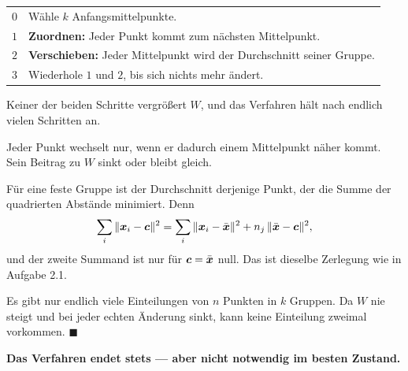 \begin{merksatz}
\begin{center}
{\small
\renewcommand{\arraystretch}{1.5}
\begin{tabular}{@{}P{1.0cm}P{7.4cm}@{}}
\toprule
$0$ & Wähle $k$ Anfangsmittelpunkte.\\
$1$ & \textbf{Zuordnen:} Jeder Punkt kommt zum nächsten Mittelpunkt.\\
$2$ & \textbf{Verschieben:} Jeder Mittelpunkt wird der Durchschnitt seiner Gruppe.\\
$3$ & Wiederhole $1$ und $2$, bis sich nichts mehr ändert.\\
\bottomrule
\end{tabular}}
\end{center}

Keiner der beiden Schritte vergrößert $W$, und das Verfahren hält nach endlich vielen Schritten an.

 Jeder Punkt wechselt nur, wenn er dadurch einem Mittelpunkt näher kommt. Sein Beitrag zu $W$ sinkt oder bleibt gleich.

 Für eine feste Gruppe ist der Durchschnitt derjenige Punkt, der die Summe der quadrierten Abstände minimiert. Denn
\[ \sum_{i}\|\boldsymbol{x}_i - \boldsymbol{c}\|^{2} = \sum_i\|\boldsymbol{x}_i - \bar{\boldsymbol{x}}\|^{2} + n_j\,\|\bar{\boldsymbol{x}} - \boldsymbol{c}\|^{2} , \]
und der zweite Summand ist nur für $\boldsymbol{c} = \bar{\boldsymbol{x}}$ null. Das ist dieselbe Zerlegung wie in Aufgabe 2.1.

 Es gibt nur endlich viele Einteilungen von $n$ Punkten in $k$ Gruppen. Da $W$ nie steigt und bei jeder echten Änderung sinkt, kann keine Einteilung zweimal vorkommen. $\blacksquare$

\begin{center}
\begin{minipage}{0.9\textwidth}
\textbf{Das Verfahren endet stets --- aber nicht notwendig im besten Zustand.}
\end{minipage}
\end{center}

\begin{center}
\begin{minipage}{0.88\textwidth}
\end{minipage}
\end{center}
\end{merksatz}

